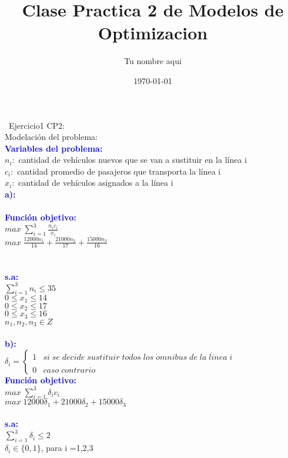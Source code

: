 \documentclass[]{article}
\begin{document}
\title{\bf Clase Practica 2 de Modelos de Optimizacion }          
\author{Tu nombre aqui}                        
\date{\today} 

\maketitle 
\noindent\ Ejercicio1 CP2:\\

\noindent Modelaci\'on del problema:\\

\noindent \textcolor{blue}{\textbf{Variables del problema:}}\\
\noindent
$n_{i}:$ cantidad de veh\'iculos nuevos que se van a sustituir en la l\'inea i\\
$c_{i}:$ cantidad promedio de pasajeros que transporta la l\'inea i\\
$x_{i}:$ cantidad de veh\'iculos asignados a la l\'inea i\\
\noindent \textcolor{blue}{\textbf{a):}}\\\\
\noindent \textcolor{blue}{\textbf{Funci\'on objetivo:}}\\ 
$max\;  \sum_{i=1}^{3}\frac{n_{i}c_{i}}{x_{i}}$
\\
$max\;  \frac{12000n_{1}}{14} + \frac{21000n_{2}}{17} + \frac{15000n_{3}}{16}$\\
\\\\
\noindent \textcolor{blue}{\textbf{s.a:}}\\
$\sum_{i=1}^{3}n_{i} \le 35$\\
$ 0\le x_{1} \le 14$\\
$ 0\le x_{2} \le 17$\\
$ 0\le x_{3} \le 16$\\
$n_{1},n_{2},n_{3} \in Z$\\\\
\noindent \textcolor{blue}{\textbf{b):}}\\

\noindent
$   
    \textbf{$\delta_{i}$}=
    \left\lbrace\begin{array}{cc}
        1 & si\; se\; decide\; sustituir\; todos\; los\; \acute{o}mnibus\; de\; la\; l\acute{i}nea\; i\\\\
        0 & caso\; contrario
    \end{array}\right.
$
\\
\noindent \textcolor{blue}{\textbf{Funci\'on objetivo:}}\\
$max\;  \sum_{i=1}^{3}\delta_{i}c_{i}$\\
$max\;  12000\delta_{1} + 21000\delta_{2} + 15000 \delta_{3}$\\\\
\noindent \textcolor{blue}{\textbf{s.a:}}\\
$\sum_{i=1}^{3}\delta_{i}\le 2$\\
$\delta_{i}\in \{0,1\}$, para i =1,2,3\\
\\\\
\end{document}
